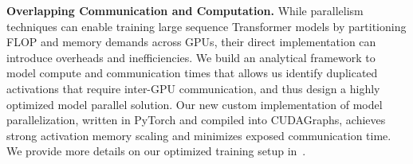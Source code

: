 \noindent \textbf{Overlapping Communication and Computation.}
While parallelism techniques can enable training large sequence Transformer models by partitioning FLOP and memory demands across GPUs, their direct implementation can introduce overheads and inefficiencies.
We build an analytical framework to model compute and communication times that allows us identify duplicated activations that require inter-GPU communication, and thus design a highly optimized model parallel solution.
Our new custom implementation of model parallelization, written in PyTorch and compiled into CUDAGraphs, achieves strong activation memory scaling and minimizes exposed communication time.
We provide more details on our optimized training setup in~.
